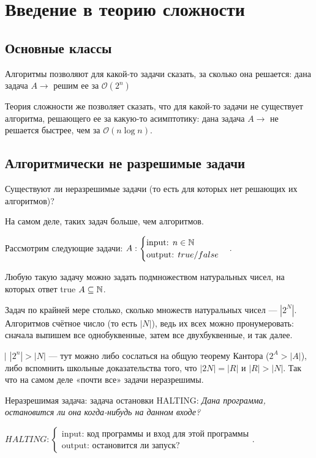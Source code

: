 \section{Введение в теорию сложности}
\subsection{Основные классы}
Алгоритмы позволяют для какой-то задачи сказать, за сколько она решается: дана задача $A\rightarrow$ решим ее за $\mathcal{O}(2^n)$

Теория сложности же позволяет сказать, что для какой-то задачи не существует алгоритма, решающего ее за какую-то асимптотику: дана задача $A\rightarrow$ не решается быстрее, чем за $\mathcal{O}(n\log n)$.

\subsection*{Алгоритмически не разрешимые задачи}
Существуют ли неразрешимые задачи (то есть для которых нет решающих их алгоритмов)?

На самом деле, таких задач больше, чем алгоритмов.

Рассмотрим следующие задачи: $A:\begin{cases} \text{input: } n\in \mathbb{N} \\
\text{output: } true/false
\end{cases}.$

Любую такую задачу можно задать подмножеством натуральных чисел, на которых ответ true $A\subseteq \mathbb{N}$.

Задач по крайней мере столько, сколько множеств натуральных чисел — $|2^N|$. Алгоритмов счётное число (то есть $|N|$), ведь их всех можно пронумеровать: сначала выпишем все однобуквенные, затем все двухбуквенные, и так далее.

$⃒|2^n| > |N|$ — тут можно либо сослаться на общую теорему Кантора (⃒$2^A > |A|$), либо вспомнить школьные доказательства того, что $|2N| = |R|$ и $|R| > |N|$. Так что на самом деле «почти все» задачи неразрешимы.

\begin{example}
    Неразрешимая задача: задача остановки HALTING: \textit{Дана программа, остановится ли она когда-нибудь на данном входе?}

    $HALTING:\begin{cases} \text{input: код программы и вход для этой программы} \\
    \text{output: остановится ли запуск?}
    \end{cases}.$
\end{example}

